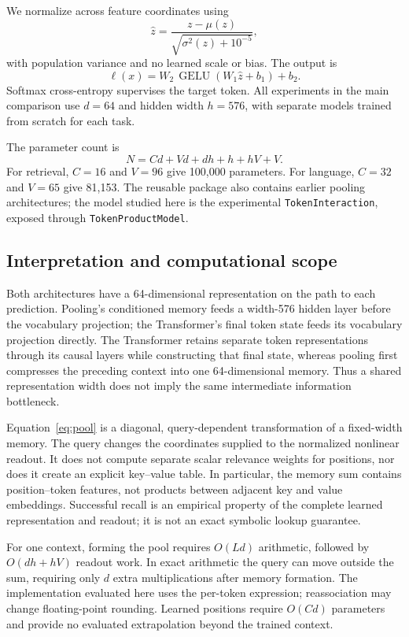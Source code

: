 \documentclass[11pt]{article}
\begin{document}
We normalize across feature coordinates using
\begin{equation}
 \widehat z=\frac{z-\mu(z)}{\sqrt{\sigma^2(z)+10^{-5}}},
\end{equation}
with population variance and no learned scale or bias. The output is
\begin{equation}
 \ell(x)=W_2\,\operatorname{GELU}(W_1\widehat z+b_1)+b_2.
\end{equation}
Softmax cross-entropy supervises the target token. All experiments in the main comparison use $d=64$ and hidden width $h=576$, with separate models trained from scratch for each task.

The parameter count is
\begin{equation}
 N=Cd+Vd+dh+h+hV+V.
\end{equation}
For retrieval, $C=16$ and $V=96$ give 100,000 parameters. For language, $C=32$ and $V=65$ give 81,153. The reusable package also contains earlier pooling architectures; the model studied here is the experimental \texttt{TokenInteraction}, exposed through \texttt{TokenProductModel}.

\subsection{Interpretation and computational scope}
Both architectures have a 64-dimensional representation on the path to each prediction. Pooling's conditioned memory feeds a width-576 hidden layer before the vocabulary projection; the Transformer's final token state feeds its vocabulary projection directly. The Transformer retains separate token representations through its causal layers while constructing that final state, whereas pooling first compresses the preceding context into one 64-dimensional memory. Thus a shared representation width does not imply the same intermediate information bottleneck.

Equation~\ref{eq:pool} is a diagonal, query-dependent transformation of a fixed-width memory. The query changes the coordinates supplied to the normalized nonlinear readout. It does not compute separate scalar relevance weights for positions, nor does it create an explicit key--value table. In particular, the memory sum contains position--token features, not products between adjacent key and value embeddings. Successful recall is an empirical property of the complete learned representation and readout; it is not an exact symbolic lookup guarantee.

For one context, forming the pool requires $O(Ld)$ arithmetic, followed by $O(dh+hV)$ readout work. In exact arithmetic the query can move outside the sum, requiring only $d$ extra multiplications after memory formation. The implementation evaluated here uses the per-token expression; reassociation may change floating-point rounding. Learned positions require $O(Cd)$ parameters and provide no evaluated extrapolation beyond the trained context.
\end{document}
